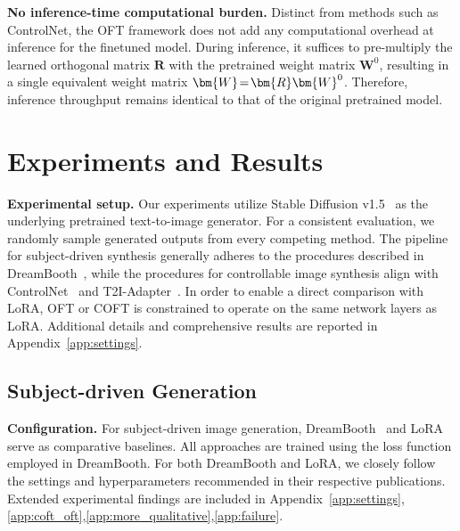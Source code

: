 {\textbf{No inference-time computational burden.} Distinct from methods such as ControlNet, the OFT framework does not add any computational overhead at inference for the finetuned model. During inference, it suffices to pre-multiply the learned orthogonal matrix $\bm{R}$ with the pretrained weight matrix $\bm{W}^0$, resulting in a single equivalent weight matrix $\thickmuskip=2mu \medmuskip=2mu \bm{W}=\bm{R}\bm{W}^0$. Therefore, inference throughput remains identical to that of the original pretrained model.

\section{Experiments and Results}

\textbf{Experimental setup.} Our experiments utilize Stable Diffusion v1.5~\cite{rombach2022high} as the underlying pretrained text-to-image generator. For a consistent evaluation, we randomly sample generated outputs from every competing method. The pipeline for subject-driven synthesis generally adheres to the procedures described in DreamBooth~\cite{ruiz2023dreambooth}, while the procedures for controllable image synthesis align with ControlNet~\cite{zhang2023adding} and T2I-Adapter~\cite{mou2023t2i}. In order to enable a direct comparison with LoRA, OFT or COFT is constrained to operate on the same network layers as LoRA. Additional details and comprehensive results are reported in Appendix~\ref{app:settings}.

\subsection{Subject-driven Generation}

\textbf{Configuration.} For subject-driven image generation, DreamBooth~\cite{ruiz2023dreambooth} and LoRA~\cite{hulora2022} serve as comparative baselines. All approaches are trained using the loss function employed in DreamBooth. For both DreamBooth and LoRA, we closely follow the settings and hyperparameters recommended in their respective publications. Extended experimental findings are included in Appendix~\ref{app:settings},\ref{app:coft_oft},\ref{app:more_qualitative},\ref{app:failure}.

}
